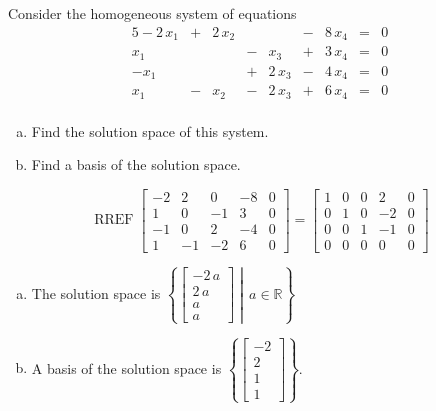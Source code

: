 
\begin{exerciseStatement}


Consider the homogeneous system of equations 
\begin{alignat*}{5} -2 \, x_{1} &+& 2 \, x_{2} & &  &-& 8 \, x_{4} &=& 0 \\x_{1} & &  &-& x_{3} &+& 3 \, x_{4} &=& 0 \\-x_{1} & &  &+& 2 \, x_{3} &-& 4 \, x_{4} &=& 0 \\x_{1} &-& x_{2} &-& 2 \, x_{3} &+& 6 \, x_{4} &=& 0 \\ \end{alignat*}
            


\begin{enumerate}[(a)]
\item  Find the solution space of this system.
\item  Find a basis of the solution space.
\end{enumerate}
    
\end{exerciseStatement}
    
\begin{exerciseAnswer} 


\[\operatorname{RREF} \left[\begin{array}{cccc|c}
-2 & 2 & 0 & -8 & 0 \\
1 & 0 & -1 & 3 & 0 \\
-1 & 0 & 2 & -4 & 0 \\
1 & -1 & -2 & 6 & 0
\end{array}\right] = \left[\begin{array}{cccc|c}
1 & 0 & 0 & 2 & 0 \\
0 & 1 & 0 & -2 & 0 \\
0 & 0 & 1 & -1 & 0 \\
0 & 0 & 0 & 0 & 0
\end{array}\right] \]


\begin{enumerate}[(a)]
\item The solution space is \( \left\{ \left[\begin{array}{c}
-2 \, a \\
2 \, a \\
a \\
a
\end{array}\right] \middle|\,a\in\mathbb{R}\right\} \)
\item A basis of the solution space is \( \left\{ \left[\begin{array}{c}
-2 \\
2 \\
1 \\
1
\end{array}\right] \right\} \).
\end{enumerate}
    
\end{exerciseAnswer}
    
